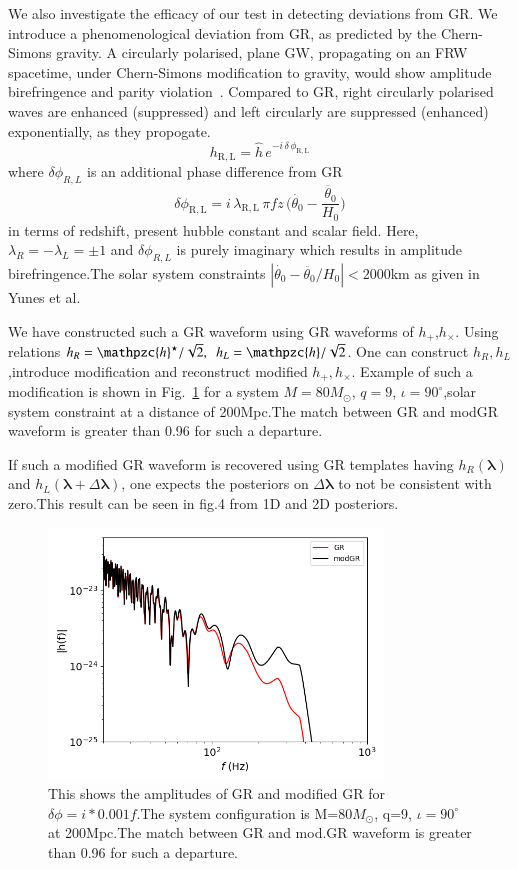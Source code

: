 \documentclass[prl,preprintnumbers,twocolumn,eqsecnum,floatfix,a4paper,nofootinbib,superscriptaddress]{revtex4}
\newcommand{\h}{\mathpzc{h}}
\newcommand{\blambda}{\bm{\lambda}}
\begin{document}
We also investigate the efficacy of our test in detecting deviations from GR. We introduce a phenomenological deviation from GR, as predicted by the Chern-Simons gravity. A circularly polarised, plane GW, propagating on
an FRW spacetime, under Chern-Simons
modification to gravity, would show amplitude
birefringence and parity violation~\cite{yunes:2010xx}. Compared to GR, right circularly polarised waves are enhanced (suppressed) and left circularly are suppressed (enhanced) exponentially, as they propogate.
% 
\begin{equation}
h_\mathrm{R,L} = \hat{h} \, e^{-i \, \delta \, \phi_\mathrm{R,L}}
\end{equation}
where $\delta \phi_{R,L}$ is an additional phase difference from GR
\begin{equation}
\delta \phi_\mathrm{R,L}=i \, \lambda_\mathrm{R,L} \, \pi f z \, \Big(\dot{\theta_0}-\frac{\ddot{\theta_0}}{H_0}\Big)
\end{equation}
in terms of redshift, present hubble constant and scalar field. Here, $\lambda_{R}=-\lambda_{L}=\pm1$ and $\delta \phi_{R,L}$ is purely imaginary which results in amplitude birefringence.The solar system constraints $|\dot{\theta_0}-\ddot{\theta_0}/{H_0}|<2000$km as given in Yunes et al.

We have constructed such a GR waveform using GR waveforms of $h_+$,$h_{\times}$. Using relations $h_R= \h^\star/\sqrt{2}, ~~ h_L= \h/\sqrt{2}$. One can construct $h_R,h_L$,introduce modification and reconstruct modified $h_+,h_{\times}$. Example of such a modification is shown in Fig.~\ref{fig:mod_gr_waveform} for a system $M = 80M_{\odot}$, $q =9$, $\iota = 90^{\circ}$,solar system constraint at a distance of 200Mpc.The match between GR and modGR waveform is greater than 0.96 for such a departure.

If such a modified GR waveform is recovered using GR templates having $h_R(\blambda)$ and $h_L(\blambda+\Delta \blambda)$, one expects
the posteriors on $\Delta \blambda$ to not be consistent with
zero.This result can be seen in fig.4 from 1D and 2D posteriors.
\begin{figure}[h]
	\includegraphics*[width=3.5in]{./../../plots/kludge_amplitude_birefringence_log_log}
	\caption{This shows the amplitudes of GR and modified GR for $\delta \phi =i*0.001f$.The system configuration is M=80$M_{\odot}$, q=9, $\iota=90^{\circ}$ at 200Mpc.The match between GR and mod.GR waveform is greater than 0.96 for such a departure.}
\label{fig:mod_gr_waveform}
\end{figure}
\end{document}
